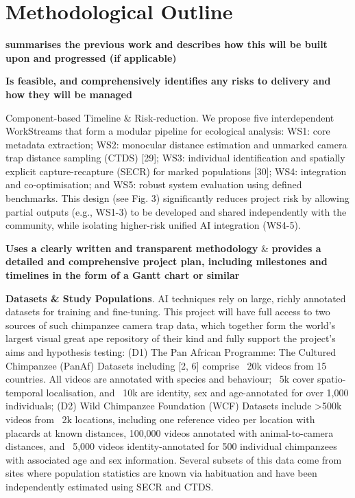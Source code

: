 \section*{Methodological Outline}

\textbf{summarises the previous work and describes how this will be built upon and progressed (if applicable)}



\textbf{Is feasible, and comprehensively identiﬁes any risks to delivery and how they will be managed}

Component-based Timeline \& Risk-reduction. We propose five interdependent WorkStreams that form a modular pipeline for ecological analysis: WS1: core metadata extraction; WS2: monocular distance estimation and unmarked camera trap distance sampling (CTDS) [29]; WS3: individual identification and spatially explicit capture-recapture (SECR) for marked populations [30]; WS4: integration and co-optimisation; and WS5: robust system evaluation using defined benchmarks. This design (see Fig. 3) significantly reduces project risk by allowing partial outputs (e.g., WS1-3) to be developed and shared independently with the community, while isolating higher-risk unified AI integration (WS4-5).

\textbf{Uses a clearly written and transparent methodology} \& \textbf{provides a detailed and comprehensive project plan, including milestones and timelines in the form of a Gantt chart or similar}

\textbf{Datasets \& Study Populations}. AI techniques rely on large, richly annotated datasets for training and fine-tuning. This project will have full access to two sources of such chimpanzee camera trap data, which together form the world’s largest visual great ape repository of their kind and fully support the project's aims and hypothesis testing: (D1) The Pan African Programme: The Cultured Chimpanzee (PanAf) Datasets including [2, 6] comprise ~20k videos from 15 countries. All videos are annotated with species and behaviour; ~5k cover spatio-temporal localisation, and ~10k are identity, sex and age-annotated for over 1,000 individuals; (D2) Wild Chimpanzee Foundation (WCF) Datasets include >500k videos from ~2k locations, including one reference video per location with placards at known distances, 100,000 videos annotated with animal-to-camera distances, and ~5,000 videos identity-annotated for 500 individual chimpanzees with associated age and sex information. Several subsets of this data come from sites where population statistics are known via habituation and have been independently estimated using SECR and CTDS.

